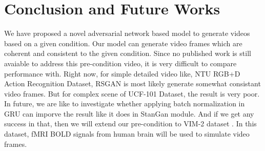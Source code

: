 \documentclass{article}
\begin{document}
\section{Conclusion and Future Works}
\label{conclusion}
We have proposed a novel adversarial network based model to generate videos based on a given condition. Our model can generate video frames which are coherent and consistent to the given condition. Since no published work is still avaiable to address this pre-condition video, it is very difficult to compare performance with. Right now, for simple detailed video like, NTU RGB+D Action Recognition Dataset, RSGAN is most likely generate somewhat consistant video frames. But for complex scene of UCF-101 Dataset, the result is very poor. In future, we are like to investigate whether applying batch normalization in GRU can imporve the result like it does in StanGan module. And if we get any success in that, then we will extend our pre-condition to VIM-2 dataset \cite{recVEBA}. In this dataset, fMRI BOLD signals from human brain will be used to simulate video frames.

\small


\end{document}
